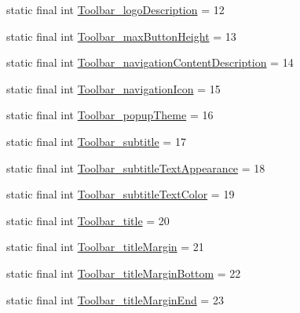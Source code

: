 \begin{DoxyCompactItemize}
\item 
static final int \mbox{\hyperlink{classandroid_1_1support_1_1v7_1_1appcompat_1_1R_1_1styleable_a90d4140553a7127f0022db99faa5c853}{Toolbar\+\_\+logo\+Description}} = 12
\item 
static final int \mbox{\hyperlink{classandroid_1_1support_1_1v7_1_1appcompat_1_1R_1_1styleable_affe8ecfe808e4ef6f9ec7d197b85487b}{Toolbar\+\_\+max\+Button\+Height}} = 13
\item 
static final int \mbox{\hyperlink{classandroid_1_1support_1_1v7_1_1appcompat_1_1R_1_1styleable_a3ba85c003fe3fb0dbf01310aa5be8787}{Toolbar\+\_\+navigation\+Content\+Description}} = 14
\item 
static final int \mbox{\hyperlink{classandroid_1_1support_1_1v7_1_1appcompat_1_1R_1_1styleable_a84175030a2bc34232cc0633a27da4f68}{Toolbar\+\_\+navigation\+Icon}} = 15
\item 
static final int \mbox{\hyperlink{classandroid_1_1support_1_1v7_1_1appcompat_1_1R_1_1styleable_a86dd147aa8ab286860ac21db4ebd64a5}{Toolbar\+\_\+popup\+Theme}} = 16
\item 
static final int \mbox{\hyperlink{classandroid_1_1support_1_1v7_1_1appcompat_1_1R_1_1styleable_adbd60df7938c772e9f8a86c5e19a8d1e}{Toolbar\+\_\+subtitle}} = 17
\item 
static final int \mbox{\hyperlink{classandroid_1_1support_1_1v7_1_1appcompat_1_1R_1_1styleable_ad1efd3d21df430b2222c4610c0943e32}{Toolbar\+\_\+subtitle\+Text\+Appearance}} = 18
\item 
static final int \mbox{\hyperlink{classandroid_1_1support_1_1v7_1_1appcompat_1_1R_1_1styleable_a7adbd084daa46b375e6d08a318eaea52}{Toolbar\+\_\+subtitle\+Text\+Color}} = 19
\item 
static final int \mbox{\hyperlink{classandroid_1_1support_1_1v7_1_1appcompat_1_1R_1_1styleable_a56aef9ae7056ca1c293e056fb1da40c3}{Toolbar\+\_\+title}} = 20
\item 
static final int \mbox{\hyperlink{classandroid_1_1support_1_1v7_1_1appcompat_1_1R_1_1styleable_a14e9f0213b518aca69cde7d8a2bf4205}{Toolbar\+\_\+title\+Margin}} = 21
\item 
static final int \mbox{\hyperlink{classandroid_1_1support_1_1v7_1_1appcompat_1_1R_1_1styleable_a0550c95fd1ad266727fc9d98e677235e}{Toolbar\+\_\+title\+Margin\+Bottom}} = 22
\item 
static final int \mbox{\hyperlink{classandroid_1_1support_1_1v7_1_1appcompat_1_1R_1_1styleable_a5af2f9d4fdf6f945d2340b5b9fa4f04c}{Toolbar\+\_\+title\+Margin\+End}} = 23
\item 

\end{DoxyCompactItemize}
